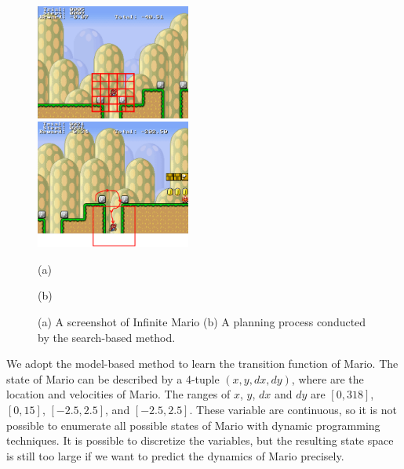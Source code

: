 \begin{figure}[t]
 \begin{minipage}[b]{0.45\linewidth}
    \begin{center}
    \includegraphics[width=2.0in] {./figures/MarioGrid.eps}
\end{center}
\end{minipage}
\begin{minipage}[b]{0.45\linewidth}
    \begin{center}
    \includegraphics[width=2.0in] {./figures/MarioModel.eps}
\end{center}
\end{minipage}
\begin{minipage}[b]{0.45\linewidth} \centering (a) \end{minipage}
\begin{minipage}[b]{0.45\linewidth} \centering (b) \end{minipage}

\caption{(a) A screenshot of Infinite Mario (b) A planning process conducted by the search-based method.}
\label{fig:Mario}
\end{figure}


We adopt the model-based method to learn the transition function of Mario.
The state of Mario 
can be described by a 4-tuple $(x, y, dx, dy)$, where are the location and velocities of Mario. 
The ranges of $x$, $y$, $dx$ and $dy$ are $[0, 318]$, $[0, 15]$, $[-2.5, 2.5]$, and $[-2.5, 2.5]$.
These variable are continuous, so it is not possible to enumerate all possible states
of Mario with dynamic programming techniques. It is possible to discretize the variables, but the resulting state space 
is still too large if we want to predict the dynamics of Mario precisely.

